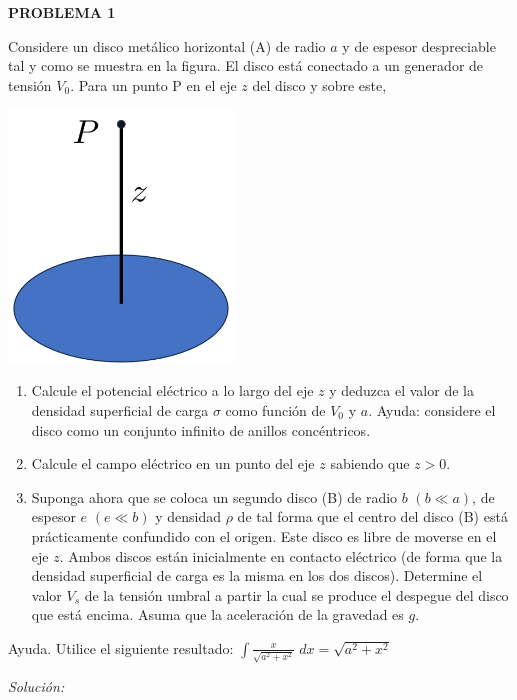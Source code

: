 \textbf{PROBLEMA 1}
\vspace{20px}

Considere un disco metálico horizontal (A) de radio $a$ y de espesor despreciable tal y como se muestra en
la figura. El disco está conectado a un generador de tensión $V_0$. Para un punto P en el eje $z$ del disco y sobre
este,

\begin{center}
    \includegraphics[width=6cm]{files/img1}
\end{center}

\begin{enumerate}[label=\alph*.]
    \item Calcule el potencial eléctrico a lo largo del eje $z$ y deduzca el valor de la densidad superficial de carga $\sigma$
    como función de $V_0$ y $a$. Ayuda: considere el disco como un conjunto infinito de anillos concéntricos.
    \item Calcule el campo eléctrico en un punto del eje $z$ sabiendo que $z > 0$.
    \item Suponga ahora que se coloca un segundo disco (B) de radio $b$ $(b \ll a)$, de espesor $e$ $(e \ll b)$ y densidad $\rho$
    de tal forma que el centro del disco (B) está prácticamente confundido con el origen. Este disco es libre
    de moverse en el eje $z$. Ambos discos están inicialmente en contacto eléctrico (de forma que la densidad
    superficial de carga es la misma en los dos discos). Determine el valor $V_s$ de la tensión umbral a partir la
    cual se produce el despegue del disco que está encima. Asuma que la aceleración de la gravedad es $g$.
\end{enumerate}

Ayuda. Utilice el siguiente resultado: $\int \frac{x}{\sqrt{a^2 + x^2}}\;dx = \sqrt {a^2 + x^2}$

\vspace{20px}
\textit{Solución:}
\\



